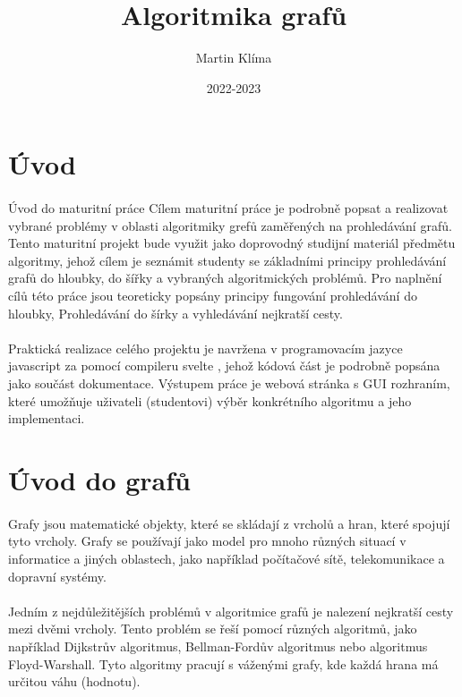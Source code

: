 \documentclass[12pt]{article}
\title{Algoritmika grafů}
\author{Martin Klíma}
\date{2022-2023}
\begin{document}
\maketitle
\newpage

\tableofcontents
\newpage

\section{Úvod}
\paragraph{}
Úvod do maturitní práce
Cílem maturitní práce je podrobně popsat a realizovat vybrané problémy v oblasti 
algoritmiky grefů zaměřených na prohledávání grafů.
Tento maturitní projekt bude využit jako doprovodný studijní materiál předmětu 
algoritmy, jehož cílem je seznámit studenty se základními principy 
prohledávání grafů do hloubky, do šířky a vybraných algoritmických problémů. 
Pro naplnění cílů této práce jsou teoreticky popsány principy fungování prohledávání do hloubky,
Prohledávání do šírky a vyhledávání nejkratší cesty.
\paragraph{}
Praktická realizace celého projektu je navržena v programovacím jazyce javascript za pomocí compileru svelte
, jehož kódová část je podrobně popsána jako součást dokumentace. Výstupem práce je webová stránka 
s GUI rozhraním, které umožňuje uživateli (studentovi) výběr konkrétního algoritmu a jeho implementaci.
\section{Úvod do grafů}
\paragraph{}
Grafy jsou matematické objekty, které se skládají z vrcholů a hran, které spojují tyto 
vrcholy. Grafy se používají jako model pro mnoho různých situací v informatice a jiných 
oblastech, jako například počítačové sítě, telekomunikace a dopravní systémy.
\paragraph{}
Jedním z nejdůležitějších problémů v algoritmice grafů je nalezení nejkratší cesty mezi 
dvěmi vrcholy. Tento problém se řeší pomocí různých algoritmů, jako například Dijkstrův 
algoritmus, Bellman-Fordův algoritmus nebo algoritmus Floyd-Warshall. Tyto algoritmy 
pracují s váženými grafy, kde každá hrana má určitou váhu (hodnotu).
\end{document}
